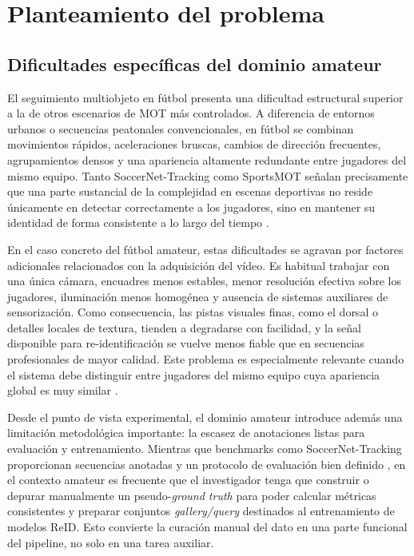 \documentclass[../MAIN.tex]{subfiles}
\begin{document}
\section{Planteamiento del problema}


\subsection{Dificultades específicas del dominio amateur}

El seguimiento multiobjeto en fútbol presenta una dificultad estructural superior a la de otros escenarios de MOT más controlados. A diferencia de entornos urbanos o secuencias peatonales convencionales, en fútbol se combinan movimientos rápidos, aceleraciones bruscas, cambios de dirección frecuentes, agrupamientos densos y una apariencia altamente redundante entre jugadores del mismo equipo. Tanto SoccerNet-Tracking como SportsMOT señalan precisamente que una parte sustancial de la complejidad en escenas deportivas no reside únicamente en detectar correctamente a los jugadores, sino en mantener su identidad de forma consistente a lo largo del tiempo \parencite{cioppa2022soccernettracking,cui2023sportsmot}.

En el caso concreto del fútbol amateur, estas dificultades se agravan por factores adicionales relacionados con la adquisición del vídeo. Es habitual trabajar con una única cámara, encuadres menos estables, menor resolución efectiva sobre los jugadores, iluminación menos homogénea y ausencia de sistemas auxiliares de sensorización. Como consecuencia, las pistas visuales finas, como el dorsal o detalles locales de textura, tienden a degradarse con facilidad, y la señal disponible para re-identificación se vuelve menos fiable que en secuencias profesionales de mayor calidad. Este problema es especialmente relevante cuando el sistema debe distinguir entre jugadores del mismo equipo cuya apariencia global es muy similar \parencite{cui2023sportsmot,wojke2017deepsort}.

Desde el punto de vista experimental, el dominio amateur introduce además una limitación metodológica importante: la escasez de anotaciones listas para evaluación y entrenamiento. Mientras que benchmarks como SoccerNet-Tracking proporcionan secuencias anotadas y un protocolo de evaluación bien definido \parencite{cioppa2022soccernettracking}, en el contexto amateur es frecuente que el investigador tenga que construir o depurar manualmente un pseudo-\textit{ground truth} para poder calcular métricas consistentes y preparar conjuntos \textit{gallery/query} destinados al entrenamiento de modelos ReID. Esto convierte la curación manual del dato en una parte funcional del pipeline, no solo en una tarea auxiliar.
\end{document}
